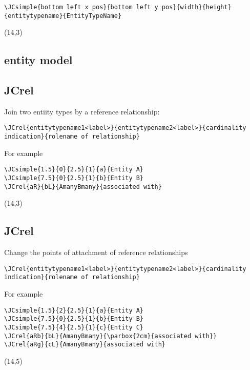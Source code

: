 \documentclass[10pt,a4paper]{article}
\begin{document}
\begin{verbatim}
\JCsimple{bottom left x pos}{bottom left y pos}{width}{height}{entitytypename}{EntityTypeName}
\end{verbatim}
\pspicture(14,3)
\endpspicture

\subsection {entity model}

\JCemend

\subsection {JCrel}
Join two entiity types by a reference relationship:
\begin{verbatim}
\JCrel{entitytypename1<label>}{entitytypename2<label>}{cardinality indication}{rolename of relationship}
\end{verbatim}
For example
\begin{verbatim}
\JCsimple{1.5}{0}{2.5}{1}{a}{Entity A}
\JCsimple{7.5}{0}{2.5}{1}{b}{Entity B}
\JCrel{aR}{bL}{AmanyBmany}{associated with}
\end{verbatim}
\pspicture(14,3)
\endpspicture

\subsection {JCrel}
Change the points of attachment of reference relationships
\begin{verbatim}
\JCrel{entitytypename1<label>}{entitytypename2<label>}{cardinality indication}{rolename of relationship}
\end{verbatim}
For example
\begin{verbatim}
\JCsimple{1.5}{2}{2.5}{1}{a}{Entity A}
\JCsimple{7.5}{0}{2.5}{1}{b}{Entity B}
\JCsimple{7.5}{4}{2.5}{1}{c}{Entity C}
\JCrel{aRb}{bL}{AmanyBmany}{\parbox{2cm}{associated with}}
\JCrel{aRg}{cL}{AmanyBmany}{associated with}
\end{verbatim}
\pspicture(14,5)
\endpspicture
\end{document}
